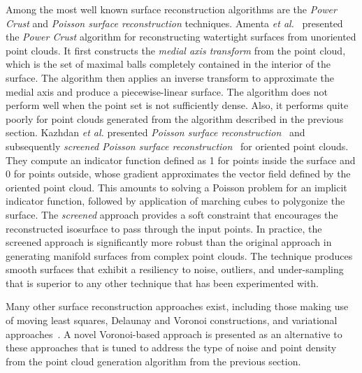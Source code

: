 Among the most well known surface reconstruction algorithms are the \textit{Power Crust} and \textit{Poisson surface reconstruction} techniques. Amenta \textit{et al.}~\cite{amenta_2001} presented the \textit{Power Crust} algorithm for reconstructing watertight surfaces from unoriented point clouds. It first constructs the \textit{medial axis transform} from the point cloud, which is the set of maximal balls completely contained in the interior of the surface. The algorithm then applies an inverse transform to approximate the medial axis and produce a piecewise-linear surface. The algorithm does not perform well when the point set is not sufficiently dense. Also, it performs quite poorly for point clouds generated from the algorithm described in the previous section. Kazhdan \textit{et al.} presented \textit{Poisson surface reconstruction}~\cite{kazhdan_2008} and subsequently \textit{screened Poisson surface reconstruction}~\cite{kazhdan_2013} for oriented point clouds. They compute an indicator function defined as 1 for points inside the surface and 0 for points outside, whose gradient approximates the vector field defined by the oriented point cloud. This amounts to solving a Poisson problem for an implicit indicator function, followed by application of marching cubes to polygonize the surface. The \textit{screened} approach provides a soft constraint that encourages the reconstructed isosurface to pass through the input points. In practice, the screened approach is significantly more robust than the original approach in generating manifold surfaces from complex point clouds. The technique produces smooth surfaces that exhibit a resiliency to noise, outliers, and under-sampling that is superior to any other technique that has been experimented with.

Many other surface reconstruction approaches exist, including those making use of moving least squares, Delaunay and Voronoi constructions, and variational approaches~\cite{berger}. A novel Voronoi-based approach is presented as an alternative to these approaches that is tuned to address the type of noise and point density from the point cloud generation algorithm from the previous section.

